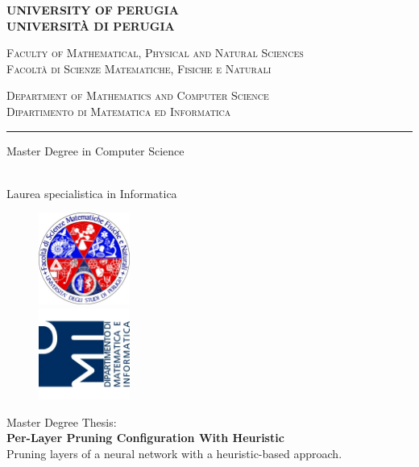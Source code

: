 \begin{titlepage}
    \begin{center}
        \textbf{\Large UNIVERSITY OF PERUGIA}\\
        \textbf{UNIVERSITÀ DI PERUGIA}
        \vspace{0.5cm}

        \scshape{Faculty of Mathematical, Physical and Natural Sciences}\\
        \scshape{Facoltà di Scienze Matematiche, Fisiche e Naturali}
        \vspace{0.5cm}

        \scshape{Department of Mathematics and Computer Science}\\
        \scshape{Dipartimento di Matematica ed Informatica}

        \rule[1mm]{\textwidth}{0.2mm}
        \vspace{0.5cm}

        \begin{Large}Master Degree in Computer Science\end{Large}\\
        Laurea specialistica in Informatica
        \vspace{0.5cm}

        \begin{figure}[htbp]
            \begin{center}
                
                \includegraphics[width=3cm]{images/ssmmffnn_logo.jpg}\\
                \includegraphics[width=3cm]{images/dmi_logo.png}
            \end{center}
        \end{figure}

        Master Degree Thesis:\\
        \vspace{0.5cm}
        \textbf{\LARGE Per-Layer Pruning Configuration With Heuristic}\\
        \vspace{0.3cm}
        Pruning layers of a neural network with a heuristic-based approach.\\
        \vspace{0.5cm}


\end{center}
\end{titlepage}
